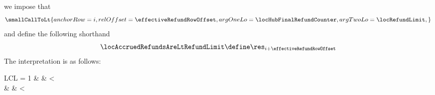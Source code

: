 \item[\underline{\underline{Row n$°(i + \effectiveRefundRowOffset)$: Effective refund:}}]
	we impose that
	\[
		\smallCallToLt {
			anchorRow = i                         ,
			relOffset = \effectiveRefundRowOffset ,
			argOneLo  = \locHubFinalRefundCounter ,
			argTwoLo  = \locRefundLimit           ,
		}
	\]
	and define the following shorthand
	\[
		\locAccruedRefundsAreLtRefundLimit
		\define
		\res_{i + \effectiveRefundRowOffset}
	\]
	\saNote{}
	The interpretation is as follows:
	\begin{IEEEeqnarray*}{LCL}
		\locAccruedRefundsAreLtRefundLimit = 1 & \iff & \locHubFinalRefundCounter < \locRefundLimit                                                                        \\
                                                       & \iff & \locHubFinalRefundCounter < \left\lfloor\frac{\locRlpGasLimit - \locHubLeftoverGas}\maxRefundQuotient\right\rfloor \\
	\end{IEEEeqnarray*}

